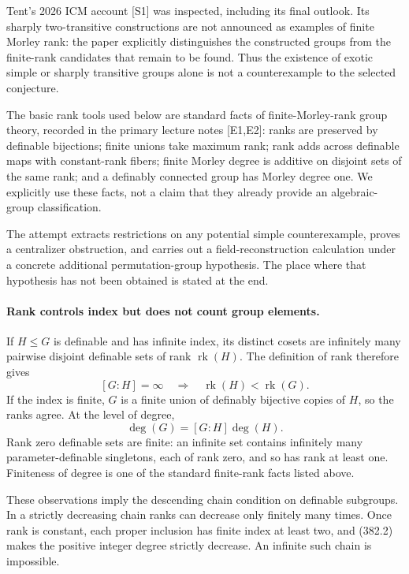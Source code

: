 \documentclass[11pt]{article}
\begin{document}
Tent's 2026 ICM account [S1] was inspected, including its final outlook.
Its sharply two-transitive constructions are not announced as examples
of finite Morley rank: the paper explicitly distinguishes the constructed
groups from the finite-rank candidates that remain to be found.
Thus the existence of exotic simple or sharply transitive groups alone
is not a counterexample to the selected conjecture.

The basic rank tools used below are standard facts of finite-Morley-rank
group theory, recorded in the primary lecture notes [E1,E2]: ranks are
preserved by definable bijections; finite unions take maximum rank;
rank adds across definable maps with constant-rank fibers; finite Morley
degree is additive on disjoint sets of the same rank; and a definably
connected group has Morley degree one. We explicitly use these facts,
not a claim that they already provide an algebraic-group classification.

The attempt extracts restrictions on any potential simple counterexample,
proves a centralizer obstruction, and carries out a field-reconstruction
calculation under a concrete additional permutation-group hypothesis.
The place where that hypothesis has not been obtained is stated at the
end.

\paragraph{Rank controls index but does not count group elements.}
If $H\le G$ is definable and has infinite index, its distinct cosets
are infinitely many pairwise disjoint definable sets of rank
$\operatorname{rk}(H)$. The definition of rank therefore gives
\[
 [G:H]=\infty\quad\Longrightarrow\quad
 \operatorname{rk}(H)<\operatorname{rk}(G).
 \tag{382.1}
\]
If the index is finite, $G$ is a finite union of definably bijective
copies of $H$, so the ranks agree. At the level of degree,
\[
 \deg(G)=[G:H]\deg(H).
 \tag{382.2}
\]
Rank zero definable sets are finite: an infinite set contains infinitely
many parameter-definable singletons, each of rank zero, and so has
rank at least one. Finiteness of degree is one of the standard finite-rank
facts listed above.

These observations imply the descending chain condition on definable
subgroups. In a strictly decreasing chain ranks can decrease only
finitely many times. Once rank is constant, each proper inclusion has
finite index at least two, and (382.2) makes the positive integer degree
strictly decrease. An infinite such chain is impossible.
\end{document}

